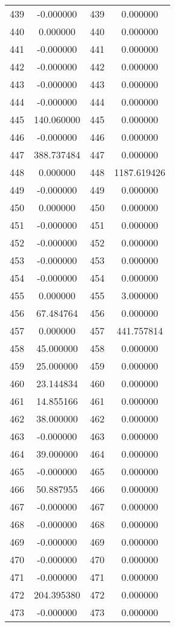 \documentclass[12pt]{article}
\begin{document}
\begin{longtable}{@{}cccc@{}}
439 & -0.000000 & 439 & 0.000000 \\
440 & 0.000000 & 440 & 0.000000 \\
441 & -0.000000 & 441 & 0.000000 \\
442 & -0.000000 & 442 & 0.000000 \\
443 & -0.000000 & 443 & 0.000000 \\
444 & -0.000000 & 444 & 0.000000 \\
445 & 140.060000 & 445 & 0.000000 \\
446 & -0.000000 & 446 & 0.000000 \\
447 & 388.737484 & 447 & 0.000000 \\
448 & 0.000000 & 448 & 1187.619426 \\
449 & -0.000000 & 449 & 0.000000 \\
450 & 0.000000 & 450 & 0.000000 \\
451 & -0.000000 & 451 & 0.000000 \\
452 & -0.000000 & 452 & 0.000000 \\
453 & -0.000000 & 453 & 0.000000 \\
454 & -0.000000 & 454 & 0.000000 \\
455 & 0.000000 & 455 & 3.000000 \\
456 & 67.484764 & 456 & 0.000000 \\
457 & 0.000000 & 457 & 441.757814 \\
458 & 45.000000 & 458 & 0.000000 \\
459 & 25.000000 & 459 & 0.000000 \\
460 & 23.144834 & 460 & 0.000000 \\
461 & 14.855166 & 461 & 0.000000 \\
462 & 38.000000 & 462 & 0.000000 \\
463 & -0.000000 & 463 & 0.000000 \\
464 & 39.000000 & 464 & 0.000000 \\
465 & -0.000000 & 465 & 0.000000 \\
466 & 50.887955 & 466 & 0.000000 \\
467 & -0.000000 & 467 & 0.000000 \\
468 & -0.000000 & 468 & 0.000000 \\
469 & -0.000000 & 469 & 0.000000 \\
470 & -0.000000 & 470 & 0.000000 \\
471 & -0.000000 & 471 & 0.000000 \\
472 & 204.395380 & 472 & 0.000000 \\
473 & -0.000000 & 473 & 0.000000 \\

\end{longtable}
\end{document}
